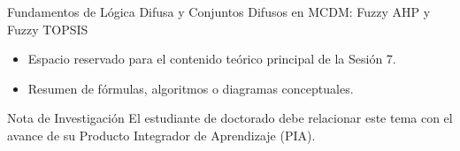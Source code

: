 \documentclass[aspectratio=169, 10pt]{beamer}
\begin{document}
\begin{frame}{Fundamentos de Lógica Difusa y Conjuntos Difusos en MCDM: Fuzzy AHP y Fuzzy TOPSIS}
    \begin{itemize}
        \item Espacio reservado para el contenido teórico principal de la Sesión 7.
        \item Resumen de fórmulas, algoritmos o diagramas conceptuales.
    \end{itemize}
    \begin{block}{Nota de Investigación}
        El estudiante de doctorado debe relacionar este tema con el avance de su Producto Integrador de Aprendizaje (PIA).
    \end{block}
\end{frame}
\end{document}

